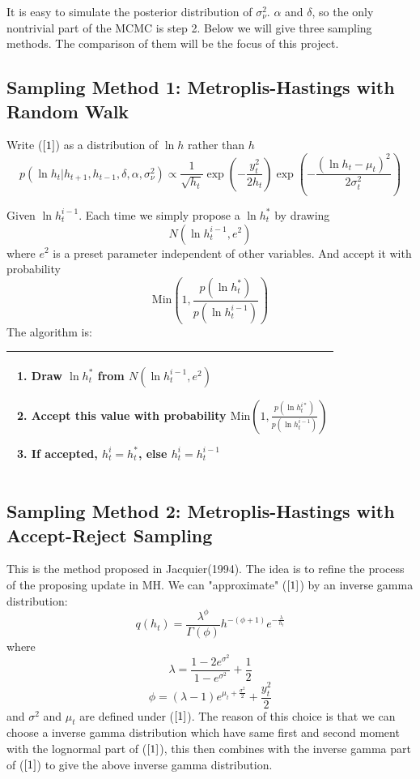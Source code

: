 \documentclass{article}
\begin{document}
It is easy to simulate the posterior distribution of $\sigma_\nu^2$. $\alpha$ and $\delta$, so the only nontrivial part of the MCMC is step 2. Below we will give three sampling methods. The comparison of them will be the focus of this project.

\subsection{Sampling Method 1: Metroplis-Hastings with Random Walk}
Write ($\ref{1}$) as a distribution of $\ln h$ rather than $h$
\[
p(\ln h_t|h_{t+1},h_{t-1},\delta,\alpha,\sigma_\nu^2)\propto\frac{1}{\sqrt{h_t}}\exp\left(-\frac{y_t^2}{2h_t}\right)\exp\left(-\frac{(\ln h_t-\mu_t)^2}{2\sigma_t^2}\right)
\]

Given $\ln h^{i-1}_t$. Each time we simply propose a $\ln h^*_t$ by drawing
\[
N(\ln h^{i-1}_t,e^2)
\] 
where $e^2$ is a preset parameter independent of other variables. And accept it with probability
\[
\textrm{Min}(1,\frac{p(\ln h^*_t)}{p(\ln h^{i-1}_t)})
\]
The algorithm is:

\begin{tabular}{|p{11cm}|}
\hline
\begin{enumerate}
\item
Draw $\ln h^*_t$ from $N(\ln h^{i-1}_t,e^2)$
\item
Accept this value with probability $\textrm{Min}(1,\frac{p(\ln h^{i*}_t)}{p(\ln h^{i-1}_t)})$
\item
If accepted, $h^i_t=h^*_t$, else $h^i_t=h^{i-1}_t$
\end{enumerate}\\
\hline
\end{tabular}

\subsection{Sampling Method 2: Metroplis-Hastings with Accept-Reject Sampling}
This is the method proposed in Jacquier(1994). The idea is to refine the process of the proposing update in MH. We can "approximate" ($\ref{1}$)  by an inverse gamma distribution:
\[
q(h_t)=\frac{\lambda^\phi}{\Gamma(\phi)}h^{-(\phi+1)}e^{-\frac{\lambda}{h_t}}
\]
where
\[
\lambda=\frac{1-2e^{\sigma^2}}{1-e^{\sigma^2}}+\frac{1}{2}
\]
\[
\phi=(\lambda-1)e^{\mu_t+\frac{\sigma^2}{2}}+\frac{y_t^2}{2}
\]
and $\sigma^2$ and $\mu_t$ are defined under ($\ref{1}$). The reason of this choice is that we can choose a inverse gamma distribution which have same first and second moment with the lognormal part of ($\ref{1}$), this then combines with the inverse gamma part of ($\ref{1}$) to give the above inverse gamma distribution.
\end{document}
